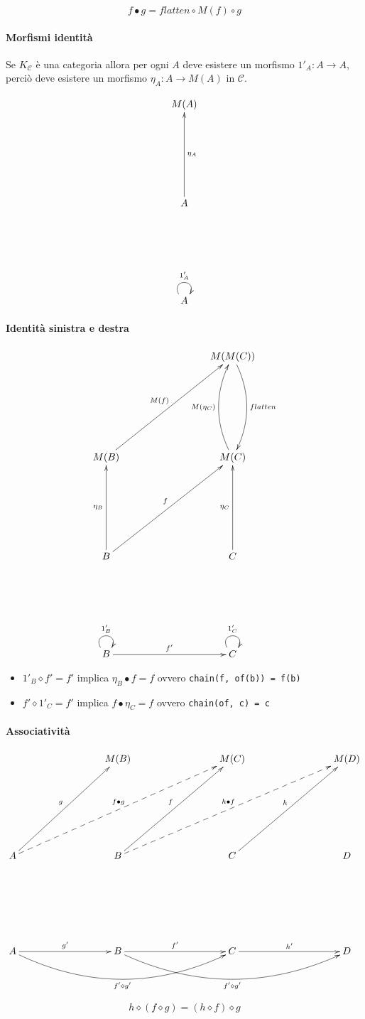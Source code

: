 \documentclass[12pt]{article}
\theoremstyle{definition}
\begin{document}
$$
f \bullet g = flatten \circ M(f) \circ g
$$

\paragraph{Morfismi identità}

Se $K_{\mathcal{C}}$ è una categoria allora per ogni $A$ deve esistere un morfismo $1'_A: A \rightarrow A$,
perciò deve esistere un morfismo $\eta_A: A \rightarrow M(A)$ in $\mathcal{C}$.

\[
\xymatrixrowsep{3cm}
\xymatrixcolsep{3cm}
\xymatrix{
  M(A) \\
  A \ar[u]_{\eta_A} \\
  A \ar@(ul,ur)^{1'_A}
}
\]

\paragraph{Identità sinistra e destra}

\[
\xymatrixrowsep{3cm}
\xymatrixcolsep{3cm}
\xymatrix{
  & M(M(C)) \ar@/_-0.5cm/[d]^{flatten} \\
  M(B) \ar[ur]^{M(f)} & M(C) \ar@/_-0.5cm/[u]^{M(\eta_C)} \\
  B \ar[u]^{\eta_B} \ar[ur]^f & C \ar[u]^{\eta_C} \\
  B \ar@(ul,ur)^{1'_B} \ar[r]^{f'} & C \ar@(ul,ur)^{1'_C}
}
\]

\begin{itemize}
  \item $1'_B \diamond f' = f'$ implica $\eta_B \bullet f = f$ ovvero \texttt{chain(f, of(b)) = f(b)}
  \item $f' \diamond 1'_C = f'$ implica $f \bullet \eta_C = f$ ovvero \texttt{chain(of, c) = c}
\end{itemize}

\paragraph{Associatività}

\[
\xymatrixrowsep{3cm}
\xymatrixcolsep{3cm}
\xymatrix{
  & M(B) & M(C) & M(D) \\
  A \ar[ur]^g \ar@{-->}[urr]^{f \bullet g} & B \ar[ur]^f \ar@{-->}[urr]^{h \bullet f} & C \ar[ur]^h & D \\
  A \ar[r]^{g'} \ar@/_1cm/[rr]_{f' \diamond g'} & B \ar[r]^{f'} \ar@/_1cm/[rr]_{f' \diamond g'} & C \ar[r]^{h'} & D
}
\]

$$
h \diamond (f \diamond g) = (h \diamond f) \diamond g
$$
\end{document}
